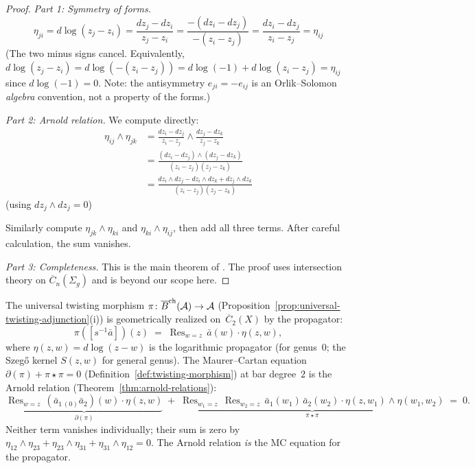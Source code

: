 \begin{proof}
\emph{Part 1: Symmetry of forms.}
\[\eta_{ji} = d\log(z_j - z_i) = \frac{dz_j - dz_i}{z_j - z_i} = \frac{-(dz_i - dz_j)}{-(z_i - z_j)} = \frac{dz_i - dz_j}{z_i - z_j} = \eta_{ij}\]
(The two minus signs cancel. Equivalently, $d\log(z_j-z_i) = d\log(-(z_i-z_j)) = d\log(-1) + d\log(z_i-z_j) = \eta_{ij}$ since $d\log(-1) = 0$. Note: the antisymmetry $e_{ji} = -e_{ij}$ is an Orlik--Solomon \emph{algebra} convention, not a property of the forms.)

\emph{Part 2: Arnold relation.}
We compute directly:
\begin{align*}
\eta_{ij} \wedge \eta_{jk} &= \frac{dz_i - dz_j}{z_i - z_j} \wedge \frac{dz_j - dz_k}{z_j - z_k} \\
&= \frac{(dz_i - dz_j) \wedge (dz_j - dz_k)}{(z_i - z_j)(z_j - z_k)} \\
&= \frac{dz_i \wedge dz_j - dz_i \wedge dz_k + dz_j \wedge dz_k}{(z_i - z_j)(z_j - z_k)}
\end{align*}
(using $dz_j \wedge dz_j = 0$)

Similarly compute $\eta_{jk} \wedge \eta_{ki}$ and $\eta_{ki} \wedge \eta_{ij}$, then add all three terms. After careful calculation, the sum vanishes.

\emph{Part 3: Completeness.}
This is the main theorem of \cite{Arnold69, FM94}. The proof uses intersection theory on $\overline{C}_n(\Sigma_g)$ and is beyond our scope here.
\end{proof}

\begin{proposition}
\label{prop:twisting-morphism-propagator}
The universal twisting morphism
$\pi\colon \overline{B}^{\mathrm{ch}}(\mathcal{A}) \to \mathcal{A}$
\textup{(}Proposition~\textup{\ref{prop:universal-twisting-adjunction}(i))}
is geometrically realized on~$\overline{C}_2(X)$ by the propagator:
\begin{equation}\label{eq:twisting-propagator-config}
\pi([s^{-1}\bar{a}])(z)
\;=\;
\operatorname{Res}_{w=z}\, \bar{a}(w) \cdot \eta(z, w),
\end{equation}
where $\eta(z,w) = d\log(z - w)$ is the logarithmic propagator
\textup{(}for genus~$0$; the Szeg\H{o} kernel $S(z,w)$ for
general genus\textup{)}.  The Maurer--Cartan equation
$\partial(\pi) + \pi \star \pi = 0$
\textup{(}Definition~\textup{\ref{def:twisting-morphism})} at bar
degree~$2$ is the Arnold relation
\textup{(}Theorem~\textup{\ref{thm:arnold-relations})}:
\[
\underbrace{\operatorname{Res}_{w=z}\,
(\bar{a}_{1\,(0)}\bar{a}_2)(w) \cdot \eta(z,w)}_{\partial(\pi)}
\;+\;
\underbrace{\operatorname{Res}_{w_1=z}\,
\operatorname{Res}_{w_2=z}\,
\bar{a}_1(w_1)\, \bar{a}_2(w_2)
\cdot \eta(z,w_1) \wedge \eta(w_1,w_2)}_{\pi \star \pi}
\;=\; 0.
\]
Neither term vanishes individually; their sum is zero by
$\eta_{12} \wedge \eta_{23} + \eta_{23} \wedge \eta_{31}
+ \eta_{31} \wedge \eta_{12} = 0$.
The Arnold relation \emph{is} the MC equation for the propagator.
\end{proposition}

